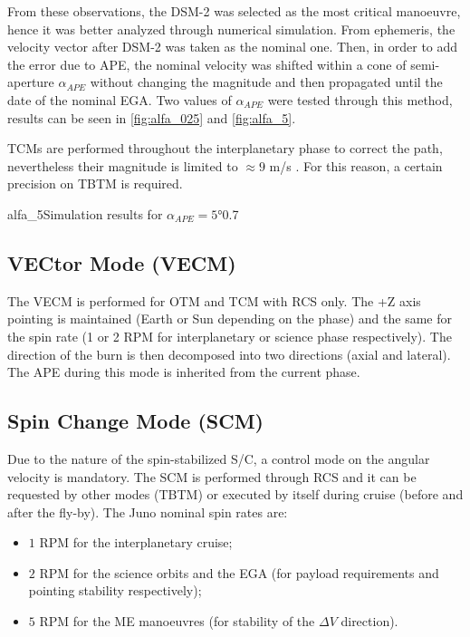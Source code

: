 From these observations, the DSM-2 was selected as the most critical manoeuvre, hence it was better analyzed through numerical simulation.
From ephemeris, the velocity vector after DSM-2 was taken as the nominal one.
Then, in order to add the error due to APE, the nominal velocity was shifted within a cone of semi-aperture $\alpha_{APE}$ without changing the magnitude and then propagated until the date of the nominal EGA.
Two values of $\alpha_{APE}$ were tested through this method, results can be seen in \autoref{fig:alfa_025} and \autoref{fig:alfa_5}.

TCMs are performed throughout the interplanetary phase to correct the path, nevertheless their magnitude is limited to $\approx 9$ m/s \cite{juno_inner}.
For this reason, a certain precision on TBTM is required.

{alfa_5}{Simulation results for $\alpha_{APE} = 5$°}{0.7}

\subsection{VECtor Mode (VECM)}
\label{subsec:vec_mode}

The VECM is performed for OTM and TCM with RCS only. The +Z axis pointing is maintained (Earth or Sun depending on the phase) and the same for the spin rate (1 or 2 RPM for interplanetary or science phase respectively). The direction of the burn is then decomposed into two directions (axial and lateral). The APE during this mode is inherited from the current phase. 

\subsection{Spin Change Mode (SCM)}
\label{subsec:spin_change_mode}

Due to the nature of the spin-stabilized S/C, a control mode on the angular velocity is mandatory. The SCM is performed through RCS and it can be requested by other modes (TBTM) or executed by itself during cruise (before and after the fly-by). The Juno nominal spin rates are:
\begin{itemize}
    \item $1$ RPM for the interplanetary cruise;
    \item $2$ RPM for the science orbits and the EGA (for payload requirements and pointing stability respectively); 
    \item $5$ RPM for the ME manoeuvres (for stability of the $\Delta V$ direction). 
\end{itemize}

